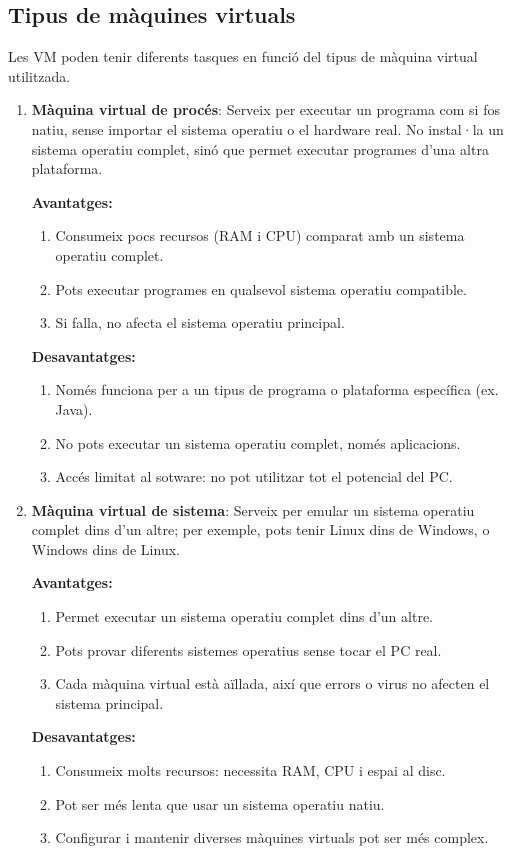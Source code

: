 \subsection{Tipus de màquines virtuals}
Les VM poden tenir diferents tasques en funció del tipus de màquina virtual utilitzada.
\begin{enumerate}
 \item \textbf{Màquina virtual de procés}: Serveix per executar un programa com si fos natiu, sense importar el sistema operatiu o el hardware real. No instal·la un sistema operatiu complet, sinó que permet executar programes d’una altra plataforma.

 \textbf{Avantatges:}
 \begin{enumerate}[1)]
  \item Consumeix pocs recursos (RAM i CPU) comparat amb un sistema operatiu complet.
  \item Pots executar programes en qualsevol sistema operatiu compatible.
  \item Si falla, no afecta el sistema operatiu principal.
 \end{enumerate}
 \textbf{Desavantatges:}
 \begin{enumerate}[1)]
  \item Només funciona per a un tipus de programa o plataforma específica (ex. Java).
  \item No pots executar un sistema operatiu complet, només aplicacions.
  \item Accés limitat al sotware: no pot utilitzar tot el potencial del PC.
 \end{enumerate}

 \item \textbf{Màquina virtual de sistema}: Serveix per emular un sistema operatiu complet dins d’un altre; per exemple, pots tenir Linux dins de Windows, o Windows dins de Linux.

  \textbf{Avantatges:}
 \begin{enumerate}[1)]
  \item Permet executar un sistema operatiu complet dins d’un altre.
  \item Pots provar diferents sistemes operatius sense tocar el PC real.
  \item Cada màquina virtual està aïllada, així que errors o virus no afecten el sistema principal.
 \end{enumerate}
 \textbf{Desavantatges:}
 \begin{enumerate}[1)]
  \item Consumeix molts recursos: necessita RAM, CPU i espai al disc.
  \item Pot ser més lenta que usar un sistema operatiu natiu.
  \item Configurar i mantenir diverses màquines virtuals pot ser més complex.
 \end{enumerate}
\end{enumerate}


